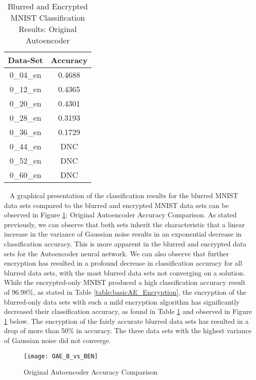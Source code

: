 \documentclass[12pt, titlepage]{article}
\begin{document}
\begin{table}[!h]
	\begin{center}
		\begin{tabular}{| c | c |}
			\hline
			\textbf{Data-Set} & \textbf{Accuracy}\\
			\hline
			0\_04\_en & 0.4688\\
			\hline
			0\_12\_en & 0.4365\\
			\hline
			0\_20\_en & 0.4301\\
			\hline
			0\_28\_en & 0.3193\\
			\hline
			0\_36\_en & 0.1729\\
			\hline
			0\_44\_en & DNC\\
			\hline
			0\_52\_en & DNC\\
			\hline
			0\_60\_en & DNC\\
			\hline
		\end{tabular}
		\caption{Blurred and Encrypted MNIST Classification Results: Original Autoencoder}
		\label{table:basicAE_BlurredEncrypted}
	\end{center}
\end{table}

~\newpage
\noindent A graphical presentation of the classification results for the blurred MNIST data sets compared to the blurred and encrypted MNIST data sets can be observed in Figure \ref{GRAPH_OriginalAE}: Original Autoencoder Accuracy Comparison. As stated previously, we can observe that both sets inherit the characteristic that a linear increase in the variance of Gaussian noise results in an exponential decrease in classification accuracy. This is more apparent in the blurred and encrypted data sets for the Autoencoder neural network. We can also observe that further encryption has resulted in a profound decrease in classification accuracy for all blurred data sets, with the most blurred data sets not converging on a solution. While the encrypted-only MNIST produced a high classification accuracy result of 96.98\%, as stated in Table \ref{table:basicAE_Encryption}, the encryption of the blurred-only data sets with such a mild encryption algorithm has significantly decreased their classification accuracy, as found in Table \ref{table:basicAE_BlurredEncrypted} and observed in Figure \ref{GRAPH_OriginalAE} below. The encryption of the fairly accurate blurred data sets has resulted in a drop of more than 50\% in accuracy. The three data sets with the highest variance of Gaussian noise did not converge.

\begin{figure}[h!]
	\begin{center}
		\texttt{[image: OAE\_B\_vs\_BEN]}
		\caption{Original Autoencoder Accuracy Comparison}
		\label{GRAPH_OriginalAE}
	\end{center}
\end{figure} 
\end{document}
